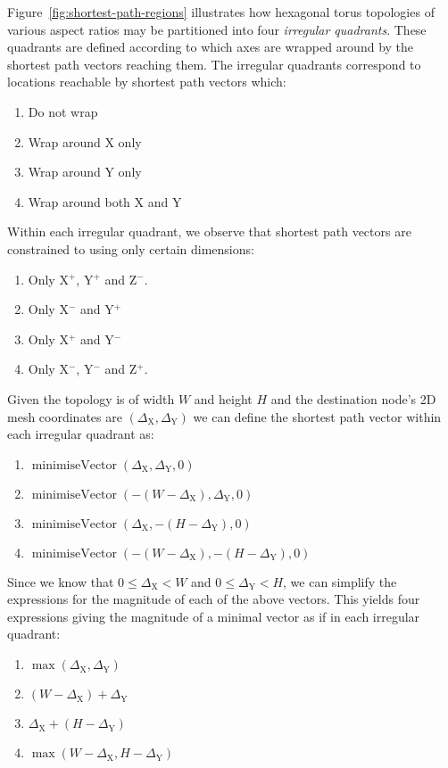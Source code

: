 			Figure~\ref{fig:shortest-path-regions} illustrates how hexagonal torus
			topologies of various aspect ratios may be partitioned into four
			\emph{irregular quadrants}. These quadrants are defined according to which
			axes are wrapped around by the shortest path vectors reaching them. The
			irregular quadrants correspond to locations reachable by shortest path
			vectors which:
			\begin{enumerate}
				\item Do not wrap
				\item Wrap around X only
				\item Wrap around Y only
				\item Wrap around both X and Y
			\end{enumerate}
			Within each irregular quadrant, we observe that shortest path vectors are
			constrained to using only certain dimensions:
			\begin{enumerate}
				\item Only X$^+$, Y$^+$ and Z$^-$.
				\item Only X$^-$ and Y$^+$
				\item Only X$^+$ and Y$^-$
				\item Only X$^-$, Y$^-$ and Z$^+$.
			\end{enumerate}
			Given the topology is of width $W$ and height $H$ and the
			destination node's 2D mesh coordinates are $(\Delta_\textrm{X},
			\Delta_\textrm{Y})$ we can define the shortest path vector within each
			irregular quadrant as:
			\begin{enumerate}
				\item $\operatorname{minimiseVector}(\Delta_\textrm{X},\Delta_\textrm{Y},0)$
				\item $\operatorname{minimiseVector}(-(W-\Delta_\textrm{X}),\Delta_\textrm{Y},0)$
				\item $\operatorname{minimiseVector}(\Delta_\textrm{X},-(H-\Delta_\textrm{Y}),0)$
				\item $\operatorname{minimiseVector}(-(W-\Delta_\textrm{X}),-(H-\Delta_\textrm{Y}),0)$
			\end{enumerate}
			Since we know that $0 \le \Delta_\textrm{X} < W$ and $0 \le
			\Delta_\textrm{Y} < H$, we can simplify the expressions for the magnitude
			of each of the above vectors. This yields four expressions giving the
			magnitude of a minimal vector as if in each irregular quadrant:
			\begin{enumerate}
				\item $\operatorname{max}(\Delta_\textrm{X}, \Delta_\textrm{Y})$
				\item $(W - \Delta_\textrm{X}) + \Delta_\textrm{Y}$
				\item $\Delta_\textrm{X} + (H - \Delta_\textrm{Y})$
				\item $\operatorname{max}(W-\Delta_\textrm{X}, H-\Delta_\textrm{Y})$
			\end{enumerate}
